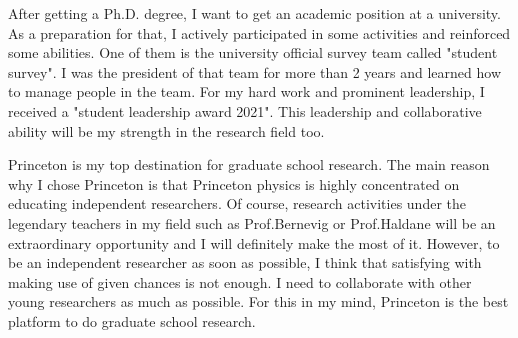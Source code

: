 \documentclass[a4]{article}
\begin{document}
After getting a Ph.D. degree, I want to get an academic position at a university. As a preparation for that, I actively participated in some activities and reinforced some abilities. One of them is the university official survey team called "student survey". I was the president of that team for more than 2 years and learned how to manage people in the team. For my hard work and prominent leadership, I received a "student leadership award 2021". This leadership and collaborative ability will be my strength in the research field too.\par

Princeton is my top destination for graduate school research. The main reason why I chose Princeton is that Princeton physics is highly concentrated on educating independent researchers. Of course, research activities under the legendary teachers in my field such as Prof.Bernevig or Prof.Haldane will be an extraordinary opportunity and I will definitely make the most of it. However, to be an independent researcher as soon as possible, I think that satisfying with making use of given chances is not enough. I need to collaborate with other young researchers as much as possible. For this in my mind, Princeton is the best platform to do graduate school research.




\end{document}
